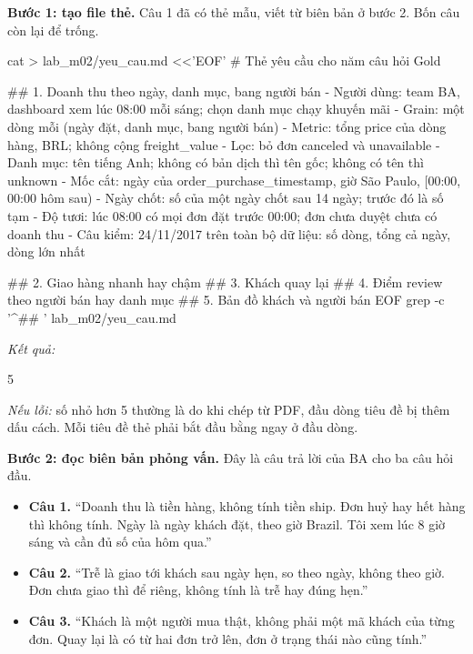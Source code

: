 \textbf{Bước 1: tạo file thẻ.} Câu 1 đã có thẻ mẫu, viết từ biên bản ở bước 2. Bốn câu còn lại để trống.

\begin{codeblock}
cat > lab_m02/yeu_cau.md <<'EOF'
# Thẻ yêu cầu cho năm câu hỏi Gold

## 1. Doanh thu theo ngày, danh mục, bang người bán
- Người dùng: team BA, dashboard xem lúc 08:00 mỗi sáng; chọn danh mục chạy khuyến mãi
- Grain: một dòng mỗi (ngày đặt, danh mục, bang người bán)
- Metric: tổng price của dòng hàng, BRL; không cộng freight_value
- Lọc: bỏ đơn canceled và unavailable
- Danh mục: tên tiếng Anh; không có bản dịch thì tên gốc; không có tên thì unknown
- Mốc cắt: ngày của order_purchase_timestamp, giờ São Paulo, [00:00, 00:00 hôm sau)
- Ngày chốt: số của một ngày chốt sau 14 ngày; trước đó là số tạm
- Độ tươi: lúc 08:00 có mọi đơn đặt trước 00:00; đơn chưa duyệt chưa có doanh thu
- Câu kiểm: 24/11/2017 trên toàn bộ dữ liệu: số dòng, tổng cả ngày, dòng lớn nhất

## 2. Giao hàng nhanh hay chậm
## 3. Khách quay lại
## 4. Điểm review theo người bán hay danh mục
## 5. Bản đồ khách và người bán
EOF
grep -c '^## ' lab_m02/yeu_cau.md
\end{codeblock}
\textit{Kết quả:}
\begin{codeblock}
5
\end{codeblock}

\textit{Nếu lỗi:} số nhỏ hơn 5 thường là do khi chép từ PDF, đầu dòng tiêu đề bị thêm dấu cách. Mỗi tiêu đề thẻ phải bắt đầu bằng \code{\#\#} ngay ở đầu dòng.

\textbf{Bước 2: đọc biên bản phỏng vấn.} Đây là câu trả lời của BA cho ba câu hỏi đầu.

\begin{ghichu}
\begin{itemize}
  \item \textbf{Câu 1.} ``Doanh thu là tiền hàng, không tính tiền ship. Đơn huỷ hay hết hàng thì không tính. Ngày là ngày khách đặt, theo giờ Brazil. Tôi xem lúc 8 giờ sáng và cần đủ số của hôm qua.''
  \item \textbf{Câu 2.} ``Trễ là giao tới khách sau ngày hẹn, so theo ngày, không theo giờ. Đơn chưa giao thì để riêng, không tính là trễ hay đúng hẹn.''
  \item \textbf{Câu 3.} ``Khách là một người mua thật, không phải một mã khách của từng đơn. Quay lại là có từ hai đơn trở lên, đơn ở trạng thái nào cũng tính.''
\end{itemize}
\end{ghichu}

